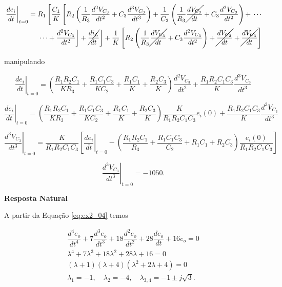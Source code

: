 \documentclass{article}
\numberwithin{equation}{section}
\newcommand{\deo}[1]{\dfrac{d^{#1}e_o}{dt^{#1}}}
\let\dfr\dfrac
\begin{document}
\begin{equation}
    \begin{split}
        \left.\dfr{de_i}{dt}\right|_{t=0} =  R_1\left[\dfr{C_1}{K}\left[R_2\left(\dfr{1}{R_3}\dfr{d^2V_{C_3}}{dt^2}+C_3\dfr{d^3V_{C_3}}{dt^3}\right)+\dfr{1}{C_2}\left(\dfr{1}{R_3}\cancel{\dfr{dV_{C_3}}{dt}}+C_3\dfr{d^2V_{C_3}}{dt^2}\right)+\right.\right.\cdots\\
        \left.\left.\cdots+\dfr{d^2V_{C_3}}{dt^2}\right]+        \cancel{\dfr{di_L}{dt}}\right]+\dfr{1}{K}\left[R_2\left(\dfr{1}{R_3}\cancel{\dfr{dV_{C_3}}{dt}}+C_3\dfr{d^2V_{C_3}}{dt^2}\right)+\cancel{\dfr{dV_{C_2}}{dt}}+\cancel{\dfr{dV_{C_3}}{dt}}\right]
    \end{split}
\end{equation}

\noindent manipulando

\begin{equation}
    \left.\dfr{de_i}{dt}\right|_{t=0} = \left(\dfr{R_1R_2C_1}{KR_3}+\dfr{R_1C_1C_3}{KC_2}+\dfr{R_1C_1}{K}+\dfr{R_2C_3}{K}\right)\dfr{d^2V_{C_3}}{dt^2}+ \dfr{R_1R_2C_1C_3}{K}\dfr{d^3V_{C_3}}{dt^3}
\end{equation}

\begin{equation}
    \left.\dfr{de_i}{dt}\right|_{t=0} = \left(\dfr{R_1R_2C_1}{KR_3}+\dfr{R_1C_1C_3}{KC_2}+\dfr{R_1C_1}{K}+\dfr{R_2C_3}{K}\right)\dfr{K}{R_1R_2C_1C_3}e_i(0)+ \dfr{R_1R_2C_1C_3}{K}\dfr{d^3V_{C_3}}{dt^3}
\end{equation}

\begin{equation}
    \left.\dfr{d^3V_{C_3}}{dt^3}\right|_{t=0} = \dfr{K}{R_1R_2C_1C_3}\left[\left.\dfr{de_i}{dt}\right|_{t=0}-\left(\dfr{R_1R_2C_1}{R_3}+\dfr{R_1C_1C_3}{C_2}+R_1C_1+R_2C_3\right)\dfr{e_i(0)}{R_1R_2C_1C_3}\right]
\end{equation}

\begin{equation}
    \left.\dfr{d^3V_{C_3}}{dt^3}\right|_{t=0} = -1050.
\end{equation}

\begin{center}
    \textbf{Resposta Natural}
\end{center}

\noindent A partir da Equação \eqref{eq:ex2_04} temos


\begin{gather*}
    \deo{4} + 7\deo{3} + 18\deo{2} + 28\dfr{de_o}{dt} + 16e_o = 0
    \\
    \lambda^{4} + 7\lambda^{3} + 18\lambda^{2} + 28\lambda + 16 = 0
    \\
    (\lambda+1)(\lambda + 4)(\lambda^{2}+2\lambda+4) = 0
    \\
    \lambda_{1}=-1, \quad \lambda_{2}=-4, \quad \lambda_{3,4}=-1\pm j\sqrt{3}.
\end{gather*}
\end{document}
